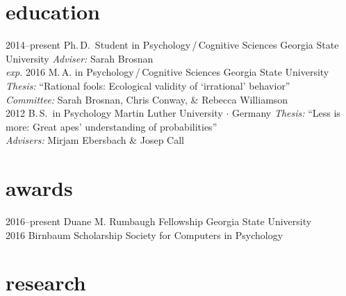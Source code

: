 \documentclass[]{friggeri-cv}
\begin{document}
\section{education}

\begin{entrylist}
  \entry
    {2014--present}
    {Ph.\,D.~Student in Psychology\,/\,Cognitive Sciences}
    {Georgia State University}
    {\emph{Adviser:} Sarah Brosnan\\[-.3cm]}
 \entry
   {\emph{exp.} 2016}
   {M.\,A. in Psychology\,/\,Cognitive Sciences}
   {Georgia State University}
   {\emph{Thesis:} ``Rational fools: Ecological validity of `irrational' behavior''\\
   \emph{Committee:} Sarah Brosnan, Chris Conway, \& Rebecca Williamson\\[-.3cm]}
  \entry
    {2012}
    {B.\,S.~in Psychology}
    {Martin Luther University $\cdot$ Germany}
    {\emph{Thesis:} ``Less is more: Great apes' understanding of probabilities''\\
    \emph{Advisers:} Mirjam Ebersbach \& Josep Call}
\end{entrylist}


\section{awards}

\begin{entrylist}
  \entry
    {2016--present}
    {Duane M. Rumbaugh Fellowship}
    {Georgia State University}
    {\\[-.7cm]}
  \entry
    {2016}
    {Birnbaum Scholarship}
    {Society for Computers in Psychology}
    {}
\end{entrylist}

\section{research}
\end{document}
